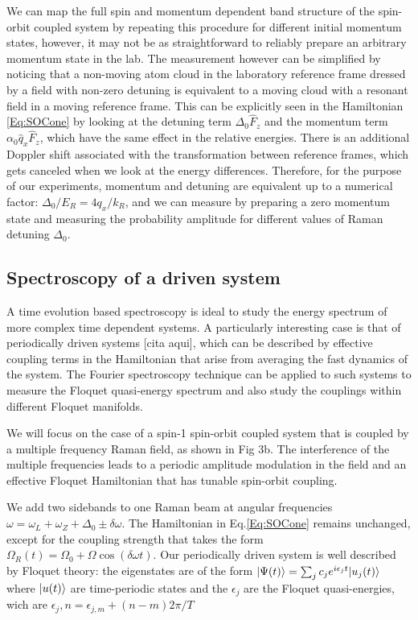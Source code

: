 We can map the full spin and momentum dependent band structure of the spin-orbit coupled system by repeating this procedure for different initial momentum states, however, it may not be as straightforward to reliably prepare an arbitrary momentum state in the lab. The measurement however can be simplified by noticing that a non-moving atom cloud in the laboratory reference frame dressed by a field with non-zero detuning is equivalent to a moving cloud with a resonant field in a moving reference frame. This can be explicitly seen in the Hamiltonian \ref{Eq:SOCone} by looking at the detuning term $\Delta_0\hat{F}_z$ and the momentum term $\alpha_0\hat{q}_x\hat{F}_z$, which have the same effect in the relative energies. There is an additional Doppler shift associated with the transformation between reference frames, which gets canceled when we look at the energy differences. Therefore, for the purpose of our experiments, momentum and detuning are equivalent up to a numerical factor: $\Delta_0/E_R=4q_x/k_R$, and we can measure by preparing a zero momentum state and measuring the probability amplitude for different values of Raman detuning $\Delta_0$. 

\subsection{Spectroscopy of a driven system}

A time evolution based spectroscopy is ideal to study the energy spectrum of more complex time dependent systems. A particularly interesting case is that of periodically driven systems [cita aqui], which can be described by effective coupling terms in the Hamiltonian that arise from averaging the fast dynamics of the system. The Fourier spectroscopy technique can be applied to such systems to measure the Floquet quasi-energy spectrum and also study the couplings within different Floquet manifolds. 

We will focus on the case of a spin-1 spin-orbit coupled system that is coupled by a multiple frequency Raman field, as shown in Fig 3b. The interference of the multiple frequencies leads to a periodic amplitude modulation in the field and an effective Floquet Hamiltonian that has tunable spin-orbit coupling. 

We add two sidebands to one Raman beam at angular frequencies $\omega=\omega_L+\omega_Z+\Delta_0 \pm \delta\omega$.  The Hamiltonian in Eq.\ref{Eq:SOCone} remains unchanged, except for the coupling strength that takes the form $	\Omega_R(t)=\Omega_0 + \Omega\cos(\delta\omega t)$. Our periodically driven system is well described by Floquet theory: the eigenstates are of the form $|\Psi(t)\rangle=\sum_{j}c_je^{i\epsilon_jt}|u_j(t)\rangle$ where $|u(t)\rangle$ are time-periodic states and the $\epsilon_j$ are the Floquet quasi-energies, wich are  $\epsilon_j,n=\epsilon_{j,m} + (n-m)2\pi/T$

